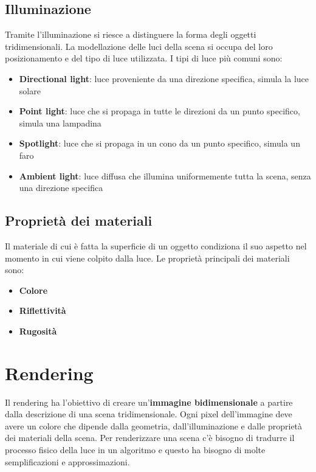 \documentclass[a4paper]{article}
\begin{document}
\subsection{Illuminazione}
Tramite l'illuminazione si riesce a distinguere la forma degli oggetti tridimensionali.
La modellazione delle luci della scena si occupa del loro posizionamento e del tipo di luce
utilizzata. I tipi di luce più comuni sono:
\begin{itemize}
  \item \textbf{Directional light}: luce proveniente da una direzione specifica, simula
    la luce solare
  \item \textbf{Point light}: luce che si propaga in tutte le direzioni da un punto
    specifico, simula una lampadina
  \item \textbf{Spotlight}: luce che si propaga in un cono da un punto specifico,
    simula un faro
  \item \textbf{Ambient light}: luce diffusa che illumina uniformemente tutta la scena,
    senza una direzione specifica
\end{itemize}

\subsection{Proprietà dei materiali}
Il materiale di cui è fatta la superficie di un oggetto condiziona il suo aspetto nel
momento in cui viene colpito dalla luce. Le proprietà principali dei materiali sono:
\begin{itemize}
  \item \textbf{Colore}
  \item \textbf{Riflettività}
  \item \textbf{Rugosità}
\end{itemize}

\section{Rendering}
Il rendering ha l'obiettivo di creare un'\textbf{immagine bidimensionale} a partire dalla
descrizione di una scena tridimensionale. Ogni pixel dell'immagine deve avere un colore
che dipende dalla geometria, dall'illuminazione e dalle proprietà dei materiali della
scena. Per renderizzare una scena c'è bisogno di tradurre il processo fisico della luce
in un algoritmo e questo ha bisogno di molte semplificazioni e approssimazioni.
\end{document}
